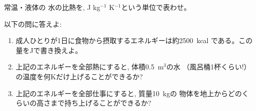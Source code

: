 \begin{q}\label{q:water_specific_heat} 常温・液体の
水の比熱を, J kg$^{-1}$ K$^{-1}$という単位で表わせ。
\end{q}

\begin{q}\label{q:cal_J} 以下の問に答えよ:
\begin{enumerate}
\item 成人ひとりが1日に食物から摂取するエネルギーは約2500~kcal
である。この量をJで書き換えよ。
\item 上記のエネルギーを全部熱にすると, 体積0.5~m$^3$の水
（風呂桶1杯くらい!）の温度を何Kだけ上げることができるか?
\item 上記のエネルギーを全部仕事にすると, 質量10~kgの
物体を地上からどのくらいの高さまで持ち上げることができるか?
\end{enumerate}
\end{q}
\mv

